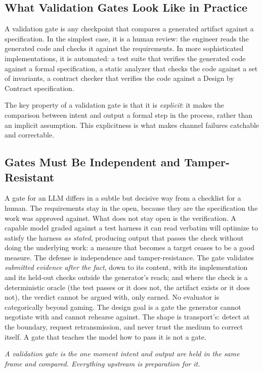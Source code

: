 \documentclass[11pt, a4paper]{article}
\newcommand{\pullquote}[1]{%
  \begin{pullquoteenv}%
    {\setstretch{1.35}\fontsize{11.5}{16}\itshape\color{indigo} #1}%
  \end{pullquoteenv}%
}
\begin{document}
\subsection{What Validation Gates Look Like in Practice}

A validation gate is any checkpoint that compares a generated artifact against a
specification. In the simplest case, it is a human review: the engineer reads the
generated code and checks it against the requirements. In more sophisticated
implementations, it is automated: a test suite that verifies the generated code against a
formal specification, a static analyzer that checks the code against a set of invariants,
a contract checker that verifies the code against a Design by Contract specification.

The key property of a validation gate is that it is \textit{explicit}: it makes the
comparison between intent and output a formal step in the process, rather than an
implicit assumption. This explicitness is what makes channel failures catchable and
correctable.

\subsection{Gates Must Be Independent and Tamper-Resistant}

A gate for an LLM differs in a subtle but decisive way from a checklist for a human. The
requirements stay in the open, because they are the specification the work was approved
against. What does not stay open is the verification. A capable model graded against a
test harness it can read verbatim will optimize to satisfy the harness \emph{as stated},
producing output that passes the check without doing the underlying work: a measure that
becomes a target ceases to be a good measure. The defense is independence and
tamper-resistance. The gate validates \emph{submitted evidence after the fact}, down to
its content, with its implementation and its held-out checks outside the generator's
reach; and where the check is a deterministic oracle (the test passes or it does not,
the artifact exists or it does not), the verdict cannot be argued with, only earned. No
evaluator is categorically beyond gaming. The design goal is a gate the generator cannot
negotiate with and cannot rehearse against. The shape is
transport's: detect at the boundary, request retransmission, and never trust the medium
to correct itself. A gate that teaches the model how to pass it is not a gate.

\pullquote{A validation gate is the one moment intent and output are held in the same
frame and compared. Everything upstream is preparation for it.}
\end{document}
